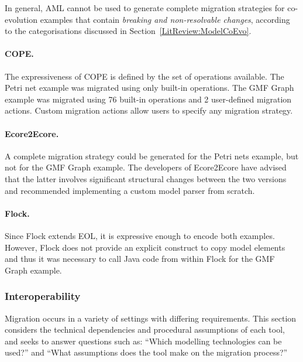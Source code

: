 In general, AML cannot be used to generate complete migration strategies for co-evolution examples that contain \emph{breaking and non-resolvable changes}, according to the categorisations discussed in Section~\ref{LitReview:ModelCoEvo}.

\paragraph{COPE.} The expressiveness of COPE is defined by the set of operations available. The Petri net example was migrated using only built-in operations. The GMF Graph example was migrated using 76 built-in operations and 2 user-defined migration actions. Custom migration actions allow users to specify any migration strategy.

\paragraph{Ecore2Ecore.} A complete migration strategy could be generated for the Petri nets example, but not for the GMF Graph example. The developers of Ecore2Ecore have advised that the latter involves significant structural changes between the two versions and recommended implementing a custom model parser from scratch.

\paragraph{Flock.} Since Flock extends EOL, it is expressive enough to encode both examples. However, Flock does not provide an explicit construct to copy model elements and thus it was necessary to call Java code from within Flock for the GMF Graph example.



\subsubsection{Interoperability}
Migration occurs in a variety of settings with differing requirements. This section considers the technical dependencies and procedural assumptions of each tool, and seeks to answer questions such as: ``Which modelling technologies can be used?'' and ``What assumptions does the tool make on the migration process?''



